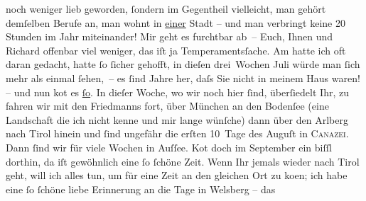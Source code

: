 \begin{ledgroupsized}[t]{13cm}
               noch weniger lieb geworden, {\pb}ſondern im Gegentheil vielleicht, man gehört demſelben Berufe an, man wohnt in \uline{einer} Stadt – und man verbringt keine 20 Stunden im
               Jahr miteinander! Mir geht es furchtbar ab – Euch, Ihnen und Richard offenbar viel weniger, das iſt ja Temperamentsſache. Am
                  \label{K_L01947_1v}\label{K_L01947_1h}{ }{\pb}hatte ich oft daran gedacht,
               hatte ſo ſicher gehofft, in dieſen drei Wochen Juli würde man ſich mehr
               als einmal ſehen, – es ſind Jahre her, daſs Sie nicht in meinem Haus waren! – und nun ko{\geminationm}t es \uline{ſo}. In dieſer
               Woche, wo wir noch hier ſind,  überſiedelt Ihr,
               zu \label{K_L01947_2v}\label{K_L01947_2h} fahren wir mit {\pb}den
                  Friedmanns fort, über München an den Bodenſee (eine Landschaft die ich nicht kenne und mir lange wünſche) dann
               über den Arlberg nach Tirol hinein und ſind ungefähr die erſten 10 Tage des
                  Auguſt in \textsc{Canazei}. Dann ſind wir für viele Wochen {\pb}in Auſſee. Ko{\geminationm}t doch im September ein
               biſſl dorthin, da iſt gewöhnlich eine ſo ſchöne Zeit.\pend
           \pstart
           Wenn Ihr jemals wieder nach Tirol geht, will ich
               alles tun, um für eine Zeit an den gleichen Ort zu ko{\geminationm}en; ich habe {\pb}eine ſo ſchöne
               liebe Erinnerung an die Tage in Welsberg – das

\end{ledgroupsized}
